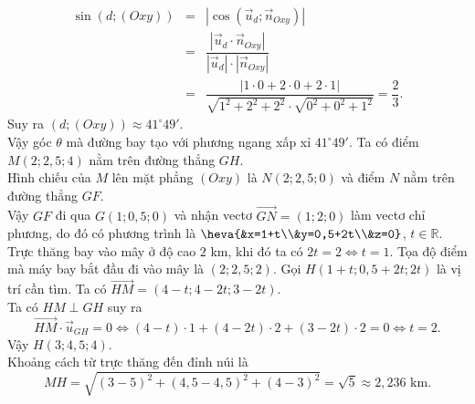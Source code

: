 \begin{ex}
{\begin{itemchoice}
	\allowdisplaybreaks
	\begin{eqnarray*}
	\sin \left(d; (Oxy)\right) &=& \left|\cos\left(\vec{u}_{d}; \vec{n}_{Oxy}\right)\right|\\
	&=& \dfrac{\left|\vec{u}_{d}\cdot \vec{n}_{Oxy}\right|}{\left|\vec{u}_{d}\right| \cdot \left| \vec{n}_{Oxy}\right|}\\
	&=& \dfrac{\left|1\cdot 0 + 2\cdot 0 + 2\cdot 1\right|}{\sqrt{1^2+2^2+2^2} \cdot \sqrt{0^2+0^2+1^2}}=\dfrac{2}{3}.	
	\end{eqnarray*}
	Suy ra $\left(d;(Oxy)\right)\approx 41^{\circ} 49'$. \\
	Vậy góc $\theta$ mà đường bay tạo với phương ngang xấp xỉ $41^{\circ} 49'$.
	\itemch Ta có điểm $M\left(2;2,5;4\right)$ nằm trên đường thẳng $GH$.\\ 
	Hình chiếu của $M$ lên mặt phẳng $(Oxy)$ là $N(2;2,5;0)$ và điểm $N$ nằm trên đường thẳng $GF$.\\
	Vậy $GF$ đi qua $G(1;0,5;0)$ và nhận vectơ $\vec{GN}=(1;2;0)$ làm vectơ chỉ phương, do đó có phương trình là $\heva{&x=1+t\\&y=0,5+2t\\&z=0}$, $t\in \mathbb{R}$.
	\itemch Trực thăng bay vào mây ở độ cao $2$ km, khi đó ta có 
	$2t=2 \Leftrightarrow t=1$. Tọa độ điểm mà máy bay bắt đầu đi vào mây là $(2;2{,}5;2)$.
	\itemch Gọi $H(1+t; 0,5+2t;2t)$ là vị trí cần tìm. Ta có $\vec{HM}=(4-t; 4-2t; 3-2t)$. \\
	Ta có $HM \perp GH$ suy ra $$\vec{HM}\cdot \vec{u}_{GH} = 0 \Leftrightarrow (4-t)\cdot 1 + (4-2t)\cdot 2 + (3-2t) \cdot 2 =0 \Leftrightarrow t=2.$$
	Vậy $H(3;4,5;4)$.\\
	Khoảng cách từ trực thăng đến đỉnh núi là $$MH = \sqrt{(3-5)^2+(4,5-4,5)^2+(4-3)^2} =\sqrt{5} \approx 2,236 \text{ km.}$$ 
	\itemch 
	\begin{center}
	\end{center}
	\end{itemchoice}
	}
\end{ex}
